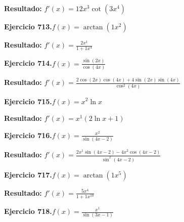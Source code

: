\documentclass[10pt,a4paper]{article}
\begin{document}
\begin{solbox}
\textbf{Resultado:} \(\displaystyle f'(x) = 12x^{3}\cot(3x^{4})\)
\end{solbox}

\begin{ejbox}
\textbf{Ejercicio 713.}\quad $f(x) = \arctan(1x^{2})$
\end{ejbox}

\begin{solbox}
\textbf{Resultado:} \(\displaystyle f'(x) = \frac{2x^{1}}{1+1x^{4}}\)
\end{solbox}

\begin{ejbox}
\textbf{Ejercicio 714.}\quad $f(x) = \frac{\sin(2x)}{\cos(4x)}$
\end{ejbox}

\begin{solbox}
\textbf{Resultado:} \(\displaystyle f'(x) = \frac{2\cos(2x)\cos(4x) + 4\sin(2x)\sin(4x)}{\cos^2(4x)}\)
\end{solbox}

\newpage
\begin{ejbox}
\textbf{Ejercicio 715.}\quad $f(x) = x^{2} \ln x$
\end{ejbox}

\begin{solbox}
\textbf{Resultado:} \(\displaystyle f'(x) = x^{1}(2\ln x + 1)\)
\end{solbox}

\begin{ejbox}
\textbf{Ejercicio 716.}\quad $f(x) = \frac{x^{2}}{\sin(4x -2)}$
\end{ejbox}

\begin{solbox}
\textbf{Resultado:} \(\displaystyle f'(x) = \frac{2x^{1}\sin(4x -2) - 4x^{2}\cos(4x -2)}{\sin^2(4x -2)}\)
\end{solbox}

\begin{ejbox}
\textbf{Ejercicio 717.}\quad $f(x) = \arctan(1x^{5})$
\end{ejbox}

\begin{solbox}
\textbf{Resultado:} \(\displaystyle f'(x) = \frac{5x^{4}}{1+1x^{10}}\)
\end{solbox}

\newpage
\begin{ejbox}
\textbf{Ejercicio 718.}\quad $f(x) = \frac{x^{1}}{\sin(3x -1)}$
\end{ejbox}
\end{document}
